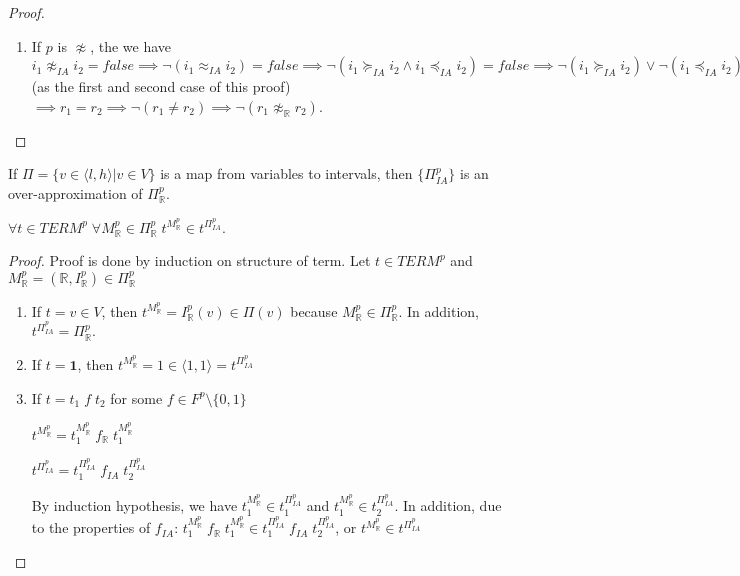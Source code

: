 \begin{proof}
\begin{enumerate}
\item If $p$ is $\not\approx$, the we have $i_1 \not\approx_{IA} i_2 = false \implies \neg(i_1 \approx_{IA} i_2) = false \implies \neg(i_1 \succeq_{IA} i_2 \wedge i_1 \preceq_{IA} i_2) = false \implies \neg(i_1 \succeq_{IA} i_2) \vee \neg(i_1 \preceq_{IA} i_2) = false \implies i_1 \prec_{IA} i_2 \vee i_1 \succ_{IA} i_2 = false \implies i_1 \prec_{IA} i_2 = false \text{ and } i_1 \succ_{IA} i_2 = false \implies r_1 \ge r_2 \text{ and } r_1 \le r_2$ (as the first and second case of this proof) $\implies r_1 = r_2 \implies \neg(r_1 \not= r_2) \implies \neg(r_1 \not\approx_\mathbb{R} r_2)$.
\end{enumerate}
\end{proof}

\begin{theorem} \label{theorem:IA-OverAprox}
If $\Pi = \{v \in \langle l, h\rangle  | v \in V\}$ is a map from variables to intervals, then $\{\Pi^p_{IA}\}$ is an over-approximation of $\Pi^p_\mathbb{R}$.
\end{theorem}

\begin{lemma} \label{lemma:IA-OT}
$\forall t \in TERM^p \; \forall M^p_\mathbb{R} \in \Pi^p_\mathbb{R} \; t^{M^p_\mathbb{R}} \in t^{\Pi^p_{IA}}$.
\end{lemma}

\begin{proof}
Proof is done by induction on structure of term.
Let $t \in TERM^p$ and $M^p_\mathbb{R} = (\mathbb{R}, I^p_\mathbb{R}) \in \Pi^p_\mathbb{R}$
\begin{enumerate}
\item If $t = v \in V$, then $t^{M^p_\mathbb{R}} = I^p_\mathbb{R}(v) \in \Pi(v)$ because $M^p_\mathbb{R} \in \Pi^p_\mathbb{R}$. In addition, $t^{\Pi^p_{IA}} = \Pi^p_\mathbb{R}$.
\item If $t = \mathbf{1}$, then $t^{M^p_\mathbb{R}} = 1 \in \langle 1, 1\rangle  = t^{\Pi^p_{IA}}$
\item If $t = t_1 \; f \; t_2$ for some $f \in F^p \setminus \{0, 1\}$

$t^{M^p_\mathbb{R}} = t_1^{M^p_\mathbb{R}} \; f_\mathbb{R} \; t_1^{M^p_\mathbb{R}}$

$t^{\Pi^p_{IA}} = t_1^{\Pi^p_{IA}} \; f_{IA} \; t_2^{\Pi^p_{IA}}$

By induction hypothesis, we have $t_1^{M^p_\mathbb{R}} \in t_1^{\Pi^p_{IA}}$ and $t_1^{M^p_\mathbb{R}} \in t_2^{\Pi^p_{IA}}$. In addition, due to the properties of $f_{IA}$: $t_1^{M^p_\mathbb{R}} \; f_\mathbb{R} \; t_1^{M^p_\mathbb{R}} \in t_1^{\Pi^p_{IA}} \; f_{IA} \; t_2^{\Pi^p_{IA}}$, or $t^{M^p_\mathbb{R}} \in t^{\Pi^p_{IA}}$ 
\end{enumerate}
\end{proof}

